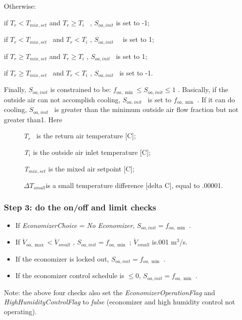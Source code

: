 Otherwise:

if \({T_r} < {T_{mix,set}}\) and \({T_r} \ge {T_i}\) ~, \({S_{oa,init}}\) is set to -1;

if \({T_r} < {T_{mix,set}}\) ~and \({T_r} < {T_i}\) , \({S_{oa,init}}\) ~~is set to 1;

if \({T_r} \ge {T_{mix,set}}\) and \({T_r} \ge {T_i}\) , \({S_{oa,init}}\) ~is set to 1;

if \({T_r} \ge {T_{mix,set}}\) ~and \({T_r} < {T_i}\) , \({S_{oa,init}}\) ~is set to -1.

Finally, \({S_{oa,init}}\) is constrained to be: \({f_{oa,\min }} \le {S_{oa,init}} \le 1\) . Basically, if the outside air can not accomplish cooling, \({S_{oa,init}}\) ~is set to \({f_{oa,\min }}\) . If it can do cooling, \({S_{oa,init}}\) ~is greater than the minimum outside air flow fraction but not greater than1. Here

~~~~~ \emph{T\(_{r}\)} ~is the return air temperature {[}C{]};

\emph{~~~~~ T\(_{i}\)} is the outside air inlet temperature {[}C{]};

\emph{~~~~~ T\(_{mix,set}\)} is the mixed air setpoint {[}C{]};

\emph{~~~~~ \(\Delta {T_{small}}\)}is a small temperature difference {[}delta C{]}, equal to .00001.

\subsubsection{Step 3: do the on/off and limit checks}\label{step-3-do-the-onoff-and-limit-checks}

\begin{itemize}
\item  If \emph{EconomizerChoice} = \emph{No Economizer}, \({S_{oa,init}} = {f_{oa,\min }}\) .

\item  If \({\dot V_{oa,\max }} < {\dot V_{small}}\) , \({S_{oa,init}} = {f_{oa,\min }}\) ; \({\dot V_{small}}\) is.001 m\(^{3}\)/s.

\item  If the economizer is locked out, \({S_{oa,init}} = {f_{oa,\min }}\) .

\item  If the economizer control schedule is \(\le 0\), \({S_{oa,init}} = {f_{oa,\min }}\) .
\end{itemize}

Note: the above four checks also set the \emph{EconomizerOperationFlag} and \emph{HighHumidityControlFlag} to \emph{false} (economizer and high humidity control not operating).

